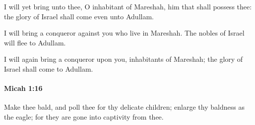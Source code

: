 			\begin{versebox}
					\item[BHS] 
					\item[LXX] 
					\item[ASV] I will yet bring unto thee, O inhabitant of Mareshah, him that shall possess thee: the glory of Israel shall come even unto Adullam.
					\item[NIV] I will bring a conqueror against you who live in Mareshah. The nobles of Israel will flee to Adullam.
					\item[NRSV] I will again bring a conqueror upon you, inhabitants of Mareshah; the glory of Israel shall come to Adullam.
			\end{versebox}

		\paragraph{Micah 1:16} %
			\label{MICAH-1-16}

			Make thee bald, and poll thee for thy delicate children; enlarge thy baldness as the eagle; for they are gone into captivity from thee.

